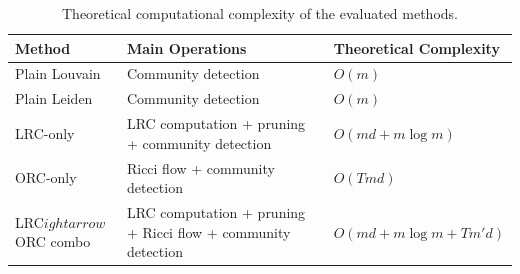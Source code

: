 \begin{table}
\caption{Theoretical computational complexity of the evaluated methods.}
\label{tab:dblp_theoretical_complexity}
\begin{tabular}{lll}
\toprule
Method & Main Operations & Theoretical Complexity \\
\midrule
Plain Louvain & Community detection & $O(m)$ \\
Plain Leiden & Community detection & $O(m)$ \\
LRC-only & LRC computation + pruning + community detection & $O(md + m\log m)$ \\
ORC-only & Ricci flow + community detection & $O(Tmd)$ \\
LRC$
ightarrow$ORC combo & LRC computation + pruning + Ricci flow + community detection & $O(md + m\log m + Tm'd)$ \\
\bottomrule
\end{tabular}
\end{table}

